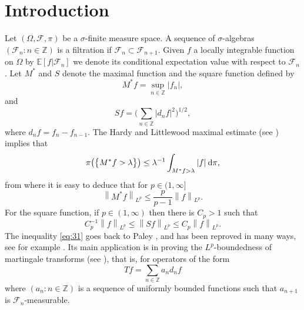 \documentclass[a4paper]{amsart}
\newcommand{\norm}[1]{{\left\lVert #1 \right\rVert}}
\newcommand{\abs}[1]{{\lvert {#1} \rvert}}
\newcommand{\dpi}{{\: \rm d}\pi}
\newcommand{\EE}{\mathbb{E}}
\newcommand{\ZZ}{\mathbb{Z}}
\newcommand{\calF}{\mathcal{F}}
\theoremstyle{plain}
\theoremstyle{definition}
\theoremstyle{remark}
\numberwithin{equation}{section}
\theoremstyle{plain}
\begin{document}
\section{Introduction}
Let $(\Omega, \calF, \pi)$ be a $\sigma$-finite measure space. A sequence of $\sigma$-algebras $(\calF_n : n \in \ZZ)$
is a filtration if $\calF_n \subset \calF_{n+1}$. Given $f$ a locally integrable function on $\Omega$ by
$\EE[f | \calF_n]$ we denote its conditional expectation value with respect to $\calF_n$. Let $M^*$ and $S$ denote
the maximal function and the square function defined by
\[
	M^* f = \sup_{n \in \ZZ} \abs{f_n},
\]
and
\begin{equation}
	\label{eq:32}
	S f = \Big(\sum_{n \in \ZZ} \abs{d_n f}^2 \Big)^{1/2},
\end{equation}
where $d_n f = f_n - f_{n-1}$. The Hardy and Littlewood maximal estimate (see \cite{hl}) implies that
\[
	\pi\big(\big\{ M^* f > \lambda \big\}\big) \leq \lambda^{-1} \int_{M^* f > \lambda} \abs{f} \dpi,
\]
from where it is easy to deduce that for $p \in (1, \infty]$
\[
	\norm{M^* f}_{L^p} \leq \frac{p}{p-1} \norm{f}_{L^p}.
\]
For the square function, if $p \in (1, \infty)$ then there is $C_p > 1$
such that
\begin{equation}
	\label{eq:31}
	C_p^{-1} \norm{f}_{L^p} \leq \norm{S f}_{L^p} \leq C_p \norm{f}_{L^p}.
\end{equation}
The inequality \eqref{eq:31} goes back to Paley \cite{pal}, and has been reproved in many ways, see for example
\cite{burk1, burk2, burk3, gundy2, mar}. Its main application is in proving the
$L^p$-boundedness of martingale transforms (see \cite{burk1}), that is, for operators of the form
\[
	T f = \sum_{n \in \ZZ} a_n d_n f
\]
where $(a_n : n \in \ZZ)$ is a sequence of uniformly bounded functions such that $a_{n+1}$ is $\calF_n$-measurable. 
\end{document}
